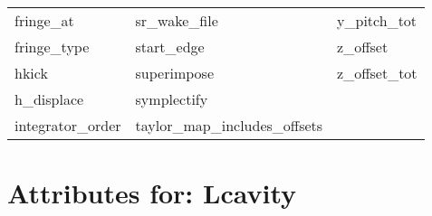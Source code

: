 \begin{tabular}{lll}
fringe_at                   & sr_wake_file                & y_pitch_tot                 \\
fringe_type                 & start_edge                  & z_offset                    \\
hkick                       & superimpose                 & z_offset_tot                \\
h_displace                  & symplectify                 &                             \\
integrator_order            & taylor_map_includes_offsets &                             \\
 \bottomrule
 \end{tabular}
 \vfill
 
 \section{Attributes for: Lcavity}
 \label{s:list.lcavity}
 
